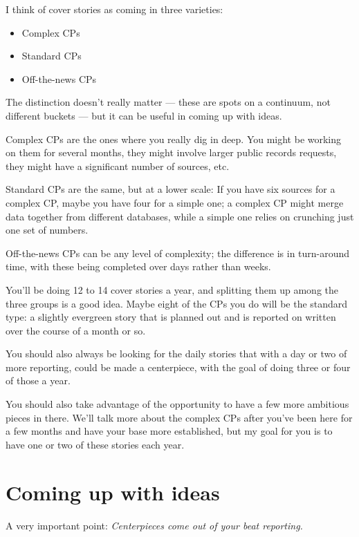 \documentclass[
  11pt,
  american,
  letterpaperpaper,
  extrafontsizes,onecolumn,openright
  ]{memoir}
\providecommand{\tightlist}{%
  \setlength{\itemsep}{0pt}\setlength{\parskip}{0pt}}
\begin{document}
I think of cover stories as coming in three varieties:

\begin{itemize}
\tightlist
\item
  Complex CPs
\item
  Standard CPs
\item
  Off-the-news CPs
\end{itemize}

The distinction doesn't really matter --- these are spots on a continuum, not different buckets --- but it can be useful in coming up with ideas.

Complex CPs are the ones where you really dig in deep. You might be working on them for several months, they might involve larger public records requests, they might have a significant number of sources, etc.

Standard CPs are the same, but at a lower scale: If you have six sources for a complex CP, maybe you have four for a simple one; a complex CP might merge data together from different databases, while a simple one relies on crunching just one set of numbers.

Off-the-news CPs can be any level of complexity; the difference is in turn-around time, with these being completed over days rather than weeks.

You'll be doing 12 to 14 cover stories a year, and splitting them up among the three groups is a good idea. Maybe eight of the CPs you do will be the standard type: a slightly evergreen story that is planned out and is reported on written over the course of a month or so.

You should also always be looking for the daily stories that with a day or two of more reporting, could be made a centerpiece, with the goal of doing three or four of those a year.

You should also take advantage of the opportunity to have a few more ambitious pieces in there. We'll talk more about the complex CPs after you've been here for a few months and have your base more established, but my goal for you is to have one or two of these stories each year.

\hypertarget{coming-up-with-ideas}{%
\section*{Coming up with ideas}\label{coming-up-with-ideas}}

A very important point: \emph{Centerpieces come out of your beat reporting.}
\end{document}
